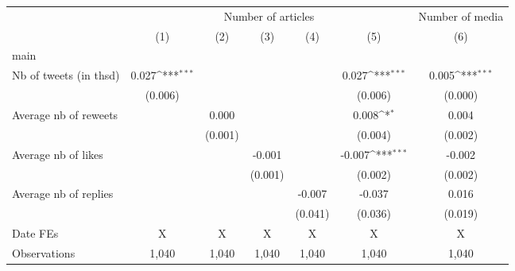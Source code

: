 {
\def\sym#1{\ifmmode^{#1}\else\(^{#1}\)\fi}
\begin{tabular}{l*{6}{c}}
\hline\hline
                    &\multicolumn{5}{c}{Number of articles}                                                                       &\multicolumn{1}{c}{Number of media}\\\cmidrule(lr){2-6}\cmidrule(lr){7-7}
                    &\multicolumn{1}{c}{(1)}         &\multicolumn{1}{c}{(2)}         &\multicolumn{1}{c}{(3)}         &\multicolumn{1}{c}{(4)}         &\multicolumn{1}{c}{(5)}         &\multicolumn{1}{c}{(6)}         \\
\hline
main                &                     &                     &                     &                     &                     &                     \\
Nb of tweets (in thsd)&       0.027\sym{***}&                     &                     &                     &       0.027\sym{***}&       0.005\sym{***}\\
                    &     (0.006)         &                     &                     &                     &     (0.006)         &     (0.000)         \\
Average nb of reweets&                     &       0.000         &                     &                     &       0.008\sym{*}  &       0.004         \\
                    &                     &     (0.001)         &                     &                     &     (0.004)         &     (0.002)         \\
Average nb of likes &                     &                     &      -0.001         &                     &      -0.007\sym{***}&      -0.002         \\
                    &                     &                     &     (0.001)         &                     &     (0.002)         &     (0.002)         \\
Average nb of replies&                     &                     &                     &      -0.007         &      -0.037         &       0.016         \\
                    &                     &                     &                     &     (0.041)         &     (0.036)         &     (0.019)         \\
\hline
Date FEs            &           X         &           X         &           X         &           X         &           X         &           X         \\
Observations        &       1,040         &       1,040         &       1,040         &       1,040         &       1,040         &       1,040         \\

\end{tabular}}
